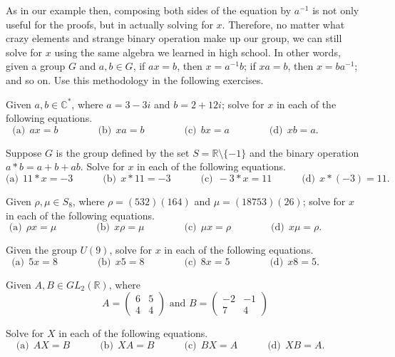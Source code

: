 As in our example then, composing both sides of the equation by $a^{-1}$ is not only useful for the proofs, but in actually solving for $x$.  Therefore, no matter what crazy elements and strange binary operation make up our group, we can still solve for $x$ using the same algebra we learned in high school.  In other words, given a group $G$ and $a,b \in G$,  if $ax =b$, then $x = a^{-1}b$; if $xa =b$, then $x = ba^{-1}$; and so on.  Use this methodology in the following exercises.    
 
\begin{exercise}{49}
Given $a, b \in {\mathbb C}^{\ast}$, where $a = 3 - 3i$ and $b = 2 + 12i$; solve for $x$ in each of the following equations.
\[
\textrm{(a)}~~ax = b \qquad \qquad
\textrm{(b)}~~xa = b\qquad\qquad
\textrm{(c)}~~bx = a\qquad\qquad
\textrm{(d)}~~xb = a.\qquad\qquad
\]
\end{exercise}

\begin{exercise}{50}
Suppose $G$ is the group defined by the set $S = {\mathbb R} \setminus \{ -1 \}$ and the binary operation $a \ast b = a + b +ab$.  Solve for $x$ in each of the following equations.
\[
\textrm{(a)}~~11 \ast x = -3 \qquad \quad
\textrm{(b)}~~x \ast 11 = -3\qquad\quad
\textrm{(c)}~~-3 \ast x = 11\qquad\quad
\textrm{(d)}~~x \ast (-3) = 11.\qquad\quad
\]
\end{exercise}

\begin{exercise}{51}
Given $\rho, \mu \in S_8$, where $\rho = (532)(164)$ and $\mu = (18753)(26)$; solve for $x$ in each of the following equations.
\[
\textrm{(a)}~~\rho x = \mu \qquad \qquad
\textrm{(b)}~~x \rho = \mu\qquad\qquad
\textrm{(c)}~~\mu x = \rho\qquad\qquad
\textrm{(d)}~~x \mu = \rho.\qquad\qquad
\]
\end{exercise}

\begin{exercise}{52}
Given the group $U(9)$, solve for $x$ in each of the following equations.
\[
\textrm{(a)}~~5x=8 \qquad \qquad
\textrm{(b)}~~x5=8\qquad\qquad
\textrm{(c)}~~8x=5\qquad\qquad
\textrm{(d)}~~x8=5.\qquad\qquad
\]
\end{exercise}

\begin{exercise}{53}
Given $A, B \in GL_2({\mathbb R})$, where
\[
A = \begin{pmatrix}
6 & 5 \\
4 & 4
\end{pmatrix} \mbox{ and }
B = \begin{pmatrix}
-2 & -1 \\
7 & 4
\end{pmatrix} \]

Solve for $X$ in each of the following equations.
\[
\textrm{(a)}~~AX=B \qquad \quad
\textrm{(b)}~~XA=B\qquad\quad
\textrm{(c)}~~BX=A\qquad\quad
\textrm{(d)}~~XB=A.\qquad\quad
\]
\end{exercise}

